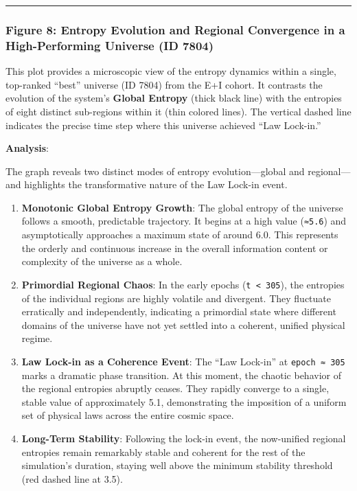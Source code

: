 \begin{center}\rule{0.5\linewidth}{0.5pt}\end{center}

\subsubsection{Figure 8: Entropy Evolution and Regional Convergence in a
High-Performing Universe (ID
7804)}\label{figure-8-entropy-evolution-and-regional-convergence-in-a-high-performing-universe-id-7804}

This plot provides a microscopic view of the entropy dynamics within a
single, top-ranked ``best'' universe (ID 7804) from the E+I cohort. It
contrasts the evolution of the system's \textbf{Global Entropy} (thick
black line) with the entropies of eight distinct sub-regions within it
(thin colored lines). The vertical dashed line indicates the precise
time step where this universe achieved ``Law Lock-in.''

\textbf{Analysis}:

The graph reveals two distinct modes of entropy evolution---global and
regional---and highlights the transformative nature of the Law Lock-in
event.

\begin{enumerate}
\def\labelenumi{\arabic{enumi}.}
\item
  \textbf{Monotonic Global Entropy Growth}: The global entropy of the
  universe follows a smooth, predictable trajectory. It begins at a high
  value (\texttt{≈5.6}) and asymptotically approaches a maximum state of
  around 6.0. This represents the orderly and continuous increase in the
  overall information content or complexity of the universe as a whole.
\item
  \textbf{Primordial Regional Chaos}: In the early epochs
  (\texttt{t\ \textless{}\ 305}), the entropies of the individual
  regions are highly volatile and divergent. They fluctuate erratically
  and independently, indicating a primordial state where different
  domains of the universe have not yet settled into a coherent, unified
  physical regime.
\item
  \textbf{Law Lock-in as a Coherence Event}: The ``Law Lock-in'' at
  \texttt{epoch\ ≈\ 305} marks a dramatic phase transition. At this
  moment, the chaotic behavior of the regional entropies abruptly
  ceases. They rapidly converge to a single, stable value of
  approximately 5.1, demonstrating the imposition of a uniform set of
  physical laws across the entire cosmic space.
\item
  \textbf{Long-Term Stability}: Following the lock-in event, the
  now-unified regional entropies remain remarkably stable and coherent
  for the rest of the simulation's duration, staying well above the
  minimum stability threshold (red dashed line at 3.5).
\end{enumerate}

